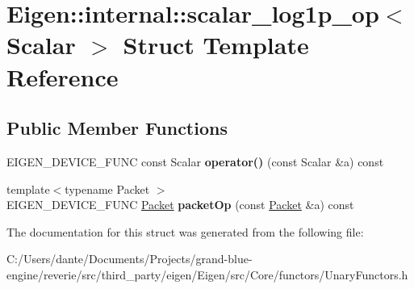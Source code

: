 \hypertarget{struct_eigen_1_1internal_1_1scalar__log1p__op}{}\section{Eigen\+::internal\+::scalar\+\_\+log1p\+\_\+op$<$ Scalar $>$ Struct Template Reference}
\label{struct_eigen_1_1internal_1_1scalar__log1p__op}
\subsection*{Public Member Functions}
\begin{DoxyCompactItemize}
\item 
\mbox{\label{struct_eigen_1_1internal_1_1scalar__log1p__op_a0ff14b196b88f85b2e5174940dcb3897}} 
E\+I\+G\+E\+N\+\_\+\+D\+E\+V\+I\+C\+E\+\_\+\+F\+U\+NC const Scalar {\bfseries operator()} (const Scalar \&a) const
\item 
\mbox{\label{struct_eigen_1_1internal_1_1scalar__log1p__op_a9802c0a7a3a1a5572c26ab99d0e35752}} 
{\footnotesize template$<$typename Packet $>$ }\\E\+I\+G\+E\+N\+\_\+\+D\+E\+V\+I\+C\+E\+\_\+\+F\+U\+NC \mbox{\hyperlink{union_eigen_1_1internal_1_1_packet}{Packet}} {\bfseries packet\+Op} (const \mbox{\hyperlink{union_eigen_1_1internal_1_1_packet}{Packet}} \&a) const
\end{DoxyCompactItemize}


The documentation for this struct was generated from the following file\+:\begin{DoxyCompactItemize}
\item 
C\+:/\+Users/dante/\+Documents/\+Projects/grand-\/blue-\/engine/reverie/src/third\+\_\+party/eigen/\+Eigen/src/\+Core/functors/Unary\+Functors.\+h\end{DoxyCompactItemize}
